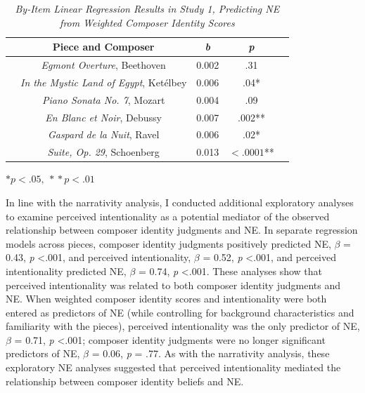 \documentclass[12pt,twoside]{reedthesis}
\begin{document}
\begin{table}[h]
	\centering
	\caption {\emph{By-Item Linear Regression Results in Study 1, Predicting NE from Weighted Composer Identity Scores}} \label{table-CI-NE}
	\bigskip
	\begin{tabular}{c c c c c}
	\toprule
	& Piece and Composer & \emph{b} & \emph{p} &\\
	\hline
	& \emph{Egmont Overture}, Beethoven & 0.002 & .31 &\\
	\hline
	& \emph{In the Mystic Land of Egypt}, Ketélbey & 0.006 & .04* &\\
	\hline
	& \emph{Piano Sonata No. 7}, Mozart & 0.004 & .09 &\\ 
	\hline
	& \emph{En Blanc et Noir}, Debussy & 0.007 & .002** &\\
	\hline
	& \emph{Gaspard de la Nuit}, Ravel & 0.006 & .02* &\\
	\hline
	& \emph{Suite, Op. 29}, Schoenberg & 0.013 & $<.0001$** &\\
	\bottomrule
	\end{tabular}\par
	\bigskip
	\small\textit{}$*p < .05,  \:*\!*p < .01$
	\end{table}

In line with the narrativity analysis, I conducted additional exploratory analyses to examine perceived intentionality as a potential mediator of the observed relationship between composer identity judgments and NE. In separate regression models across pieces, composer identity judgments positively predicted NE, $\beta$ = 0.43, \emph{p} \textless .001, and perceived intentionality, $\beta$ = 0.52, \emph{p} \textless .001, and perceived intentionality predicted NE, $\beta$ = 0.74, \emph{p} \textless .001. These analyses show that perceived intentionality was related to both composer identity judgments and NE. When weighted composer identity scores and intentionality were both entered as predictors of NE (while controlling for background characteristics and familiarity with the pieces), perceived intentionality was the only predictor of NE, $\beta$ = 0.71, \emph{p} \textless .001; composer identity judgments were no longer significant predictors of NE, $\beta$ = 0.06, \emph{p} = .77. As with the narrativity analysis, these exploratory NE analyses suggested that perceived intentionality mediated the relationship between composer identity beliefs and NE.
\end{document}
